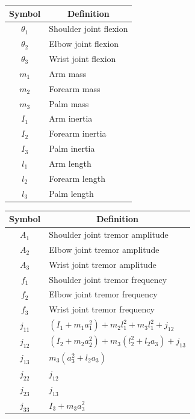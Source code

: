 \begin{tabular}{c|l}
    Symbol & \multicolumn{1}{c}{Definition} \\
    \hline
    $\theta_1$ & Shoulder joint flexion \\
    $\theta_2$ & Elbow joint flexion \\
    $\theta_3$ & Wrist joint flexion \\
    $m_1$ & Arm mass \\
    $m_2$ & Forearm mass \\
    $m_3$ & Palm mass \\
    $I_1$ & Arm inertia \\
    $I_2$ & Forearm inertia \\
    $I_3$ & Palm inertia \\
    $l_1$ & Arm length \\
    $l_2$ & Forearm length \\
    $l_3$ & Palm length 
\end{tabular}
%
%
\begin{tabular}{c|l}
    Symbol & \multicolumn{1}{c}{Definition} \\
    \hline
    $A_1$ & Shoulder joint tremor amplitude \\
    $A_2$ & Elbow joint tremor amplitude \\
    $A_3$ & Wrist joint tremor amplitude \\
    $f_1$ & Shoulder joint tremor frequency \\
    $f_2$ & Elbow joint tremor frequency \\
    $f_3$ & Wrist joint tremor frequency \\
    $j_{11}$ & 
    $
    (I_1 + m_1a_1^2) +
    m_2l_1^2 +
    m_3l_1^2 + j_{12}$ 
    \\
    $j_{12}$ & 
    $
    (I_2 + m_2a_2^2) + m_3(l_2^2 + l_2a_3) + j_{13}
    $ \\
    $j_{13}$ & $m_3(a_3^2 + l_2a_3)$ 
    \\
    $j_{22}$ & $j_{12}$ \\
    $j_{23}$ & $j_{13}$ \\
    $j_{33}$ & $I_3 + m_3a_3^2$
\end{tabular}
